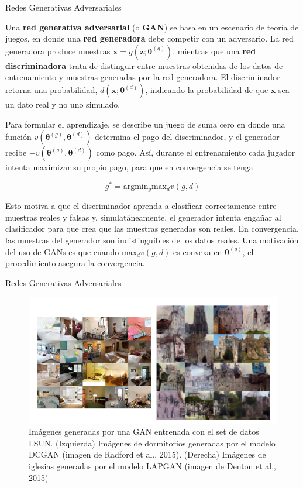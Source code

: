 \documentclass[9pt]{beamer}
\begin{document}
\begin{frame}{Redes Generativas Adversariales}

Una \textbf{red generativa adversarial} (o \textbf{GAN}) se basa en un escenario de teoría de juegos, en donde una \textbf{red generadora} debe competir con un adversario. La red generadora produce muestras $\bm{x} = g(\bm{z};\bm{\theta}^{(g)})$, mientras que una \textbf{red discriminadora} trata de distinguir entre muestras obtenidas de los datos de entrenamiento y muestras generadas por la red generadora. El discriminador retorna una probabilidad, $d(\bm{x};\bm{\theta}^{(d)})$, indicando la probabilidad de que $\bm{x}$ sea un dato real y no uno simulado. \pause
 
Para formular el aprendizaje, se describe un juego de suma cero en donde una función $v(\bm{\theta}^{(g)},\bm{\theta}^{(d)})$ determina el pago del discriminador, y el generador recibe $-v(\bm{\theta}^{(g)},\bm{\theta}^{(d)})$ como pago. Así, durante el entrenamiento cada jugador intenta maximizar su propio pago, para que en convergencia se tenga \pause

\begin{equation*}
g^{*} = \textrm{arg} \textrm{min}_{g} \textrm{max}_{d} v(g,d)
\end{equation*} \pause

Esto motiva a que el discriminador aprenda a clasificar correctamente entre muestras reales y falsas y, simulatáneamente, el generador intenta engañar al clasificador para que crea que las muestras generadas son reales. En convergencia, las muestras del generador son indistinguibles de los datos reales. Una motivación del uso de GANs es que cuando $\textrm{max}_{d} v(g,d)$ es convexa en $\bm{\theta}^{(g)}$, el procedimiento asegura la convergencia.


\end{frame}

\begin{frame}{Redes Generativas Adversariales}
\begin{figure}[H]
\captionsetup{font=small,labelfont=small}
\centering
\includegraphics[scale=.7]{../img/cap7_gans.PNG}
\caption{Imágenes generadas por una GAN entrenada con el set de datos LSUN. (Izquierda) Imágenes de dormitorios generadas por el modelo DCGAN (imagen de Radford et al., 2015). (Derecha) Imágenes de iglesias generadas por el modelo LAPGAN (imagen de Denton et al., 2015)}
\end{figure}

\end{frame}

\begin{frame}
  \titlepage
\end{frame}







\end{document}
